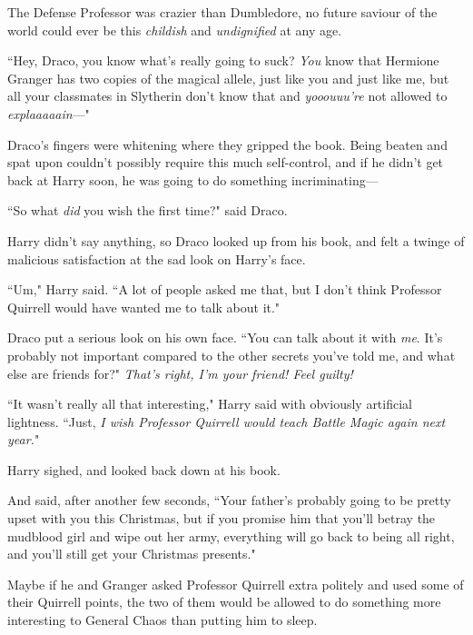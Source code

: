 The Defense Professor was crazier than Dumbledore, no future saviour of the world could ever be this \emph{childish} and \emph{undignified} at any age.

``Hey, Draco, you know what's really going to suck? \emph{You} know that Hermione Granger has two copies of the magical allele, just like you and just like me, but all your classmates in Slytherin don't know that and \emph{yooouuu're} not allowed to \emph{explaaaaain}—"

Draco's fingers were whitening where they gripped the book. Being beaten and spat upon couldn't possibly require this much self-control, and if he didn't get back at Harry soon, he was going to do something incriminating—

``So what \emph{did} you wish the first time?" said Draco.

Harry didn't say anything, so Draco looked up from his book, and felt a twinge of malicious satisfaction at the sad look on Harry's face.

``Um," Harry said. ``A lot of people asked me that, but I don't think Professor Quirrell would have wanted me to talk about it."

Draco put a serious look on his own face. ``You can talk about it with \emph{me}. It's probably not important compared to the other secrets you've told me, and what else are friends for?" \emph{That's right, I'm your friend! Feel guilty!}

``It wasn't really all that interesting," Harry said with obviously artificial lightness. ``Just, \emph{I wish Professor Quirrell would teach Battle Magic again next year.}"

Harry sighed, and looked back down at his book.

And said, after another few seconds, ``Your father's probably going to be pretty upset with you this Christmas, but if you promise him that you'll betray the mudblood girl and wipe out her army, everything will go back to being all right, and you'll still get your Christmas presents."

Maybe if he and Granger asked Professor Quirrell extra politely and used some of their Quirrell points, the two of them would be allowed to do something more interesting to General Chaos than putting him to sleep.

